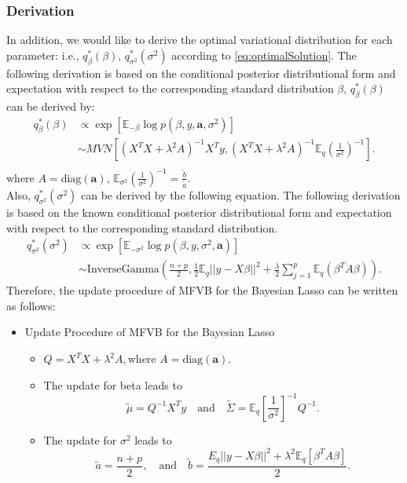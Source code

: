 \subsubsection{Derivation}
In addition, we would like to derive the optimal variational distribution for each parameter: i.e., $q_{\beta}^*(\beta)$, $q_{\sigma^2}^*(\sigma^2)$ according to \autoref{eq:optimalSolution}.
The following derivation is based on the conditional posterior distributional form and expectation with respect to the corresponding standard distribution
$\beta$, $q_{\beta}^{*}(\beta)$ can be derived by:
\begin{equation}
	\begin{aligned}
		q_{\beta}^{*}(\beta) & \propto \exp\left[ \mathbb{E}_{-\beta}\log p(\beta, y,\mathbf{a},\sigma^2) \right]\\
		& \sim MVN\left[ (X^TX + \lambda^2 A)^{-1}X^Ty, (X^TX+\lambda^2A)^{-1}\mathbb{E}_{q}\left(\frac{1}{\sigma^2}\right)^{-1} \right].\\
	\end{aligned}
\end{equation}
where $A = \text{diag}(\mathbf{a})$, $\mathbb{E}_{\sigma^2}(\frac{1}{\sigma^2})^{-1} = \frac{\tilde{b}}{\tilde{a}}$.\\
Also, $q_{\sigma^2}^{*}(\sigma^2)$ can be derived by the following equation.
The following derivation is based on the known conditional posterior distributional form and expectation with respect to the corresponding standard distribution.
\begin{equation}
	\begin{aligned}
		q_{\sigma^2}^{*}(\sigma^2) & \propto \exp \left[\mathbb{E}_{-\sigma^2} \log p(\beta, y,\sigma^2, \mathbf{a}) \right]\\
		&\sim \text{InverseGamma}\left(
  \frac{n+p}{2}, \frac{1}{2} \mathbb{E}_q||y-X\beta||^2 + \frac{\lambda}{2}\sum_{j=1}^p \mathbb{E}_q(\beta^TA\beta) \right).
	\end{aligned}
\end{equation}
%
Therefore, the update procedure of MFVB for the Bayesian Lasso can be written as follows:
\begin{itemize}
	\item Update Procedure of MFVB for the Bayesian Lasso
	\begin{itemize}
		\item  $Q = X^TX + \lambda^2 A ,\text{where } A = \mbox{diag}(\textbf{a})$.
		
		\item The update for beta leads to 
		$$
		\widetilde{\mu} = Q^{-1}X^Ty \quad \mbox{and} \quad \widetilde{\Sigma} = \mathbb{E}_{q}\left[\frac{1}{\sigma^2}\right]^{-1} Q^{-1}.$$ 
		
		\item  The update for $\sigma^2$ leads to 
		$$
		\widetilde{a} = \frac{n+p}{2}, \quad \mbox{and} \quad \widetilde{b} = \frac{E_{q}||y-X\beta||^2 + \lambda^2 \mathbb{E}_{q}[\beta^TA\beta]}{2}.
		$$
	\end{itemize}
\end{itemize}
